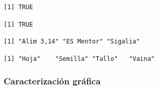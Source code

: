 \documentclass[
  letterpaper,
  DIV=11,
  numbers=noendperiod]{scrartcl}
\newenvironment{Shaded}{\begin{snugshade}}{\end{snugshade}}
\newcommand{\CommentTok}[1]{\textcolor[rgb]{0.37,0.37,0.37}{#1}}
\newcommand{\FunctionTok}[1]{\textcolor[rgb]{0.28,0.35,0.67}{#1}}
\newcommand{\NormalTok}[1]{\textcolor[rgb]{0.00,0.23,0.31}{#1}}
\newcommand{\SpecialCharTok}[1]{\textcolor[rgb]{0.37,0.37,0.37}{#1}}
\begin{document}
\begin{Shaded}
\end{Shaded}

\begin{verbatim}
[1] TRUE
\end{verbatim}

\begin{Shaded}
\end{Shaded}

\begin{verbatim}
[1] TRUE
\end{verbatim}

\begin{Shaded}
\end{Shaded}

\begin{verbatim}
[1] "Alim 3,14" "ES Mentor" "Sigalia"  
\end{verbatim}

\begin{Shaded}
\end{Shaded}

\begin{verbatim}
[1] "Hoja"    "Semilla" "Tallo"   "Vaina"  
\end{verbatim}

\hypertarget{caracterizaciuxf3n-gruxe1fica}{%
\subsubsection{Caracterización
gráfica}\label{caracterizaciuxf3n-gruxe1fica}}
\end{document}
